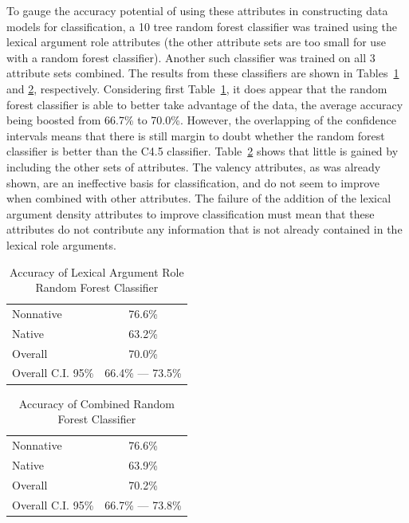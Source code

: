 \documentclass[main.tex]{subfiles}
\begin{document}
To gauge the accuracy potential of using these attributes in constructing data models for classification, a 10 tree random forest classifier was trained using the lexical argument role attributes (the other attribute sets are too small for use with a random forest classifier). Another such classifier was trained on all 3 attribute sets combined. The results from these classifiers are shown in Tables~\ref{table:lex-role-rf-results} and \ref{table:combined-rf-results}, respectively. Considering first Table~\ref{table:lex-role-rf-results}, it does appear that the random forest classifier is able to better take advantage of the data, the average accuracy being boosted from 66.7\% to 70.0\%. However, the overlapping of the confidence intervals means that there is still margin to doubt whether the random forest classifier is better than the C4.5 classifier. Table~\ref{table:combined-rf-results} shows that little is gained by including the other sets of attributes. The valency attributes, as was already shown, are an ineffective basis for classification, and do not seem to improve when combined with other attributes. The failure of the addition of the lexical argument density attributes to improve classification must mean that these attributes do not contribute any information that is not already contained in the lexical role arguments.

\begin{table}[ht]
\centering
\caption{Accuracy of Lexical Argument Role Random Forest Classifier}
\begin{tabular}{l c}
\toprule
Nonnative & 76.6\% \\
Native & 63.2\% \\
Overall & 70.0\% \\
Overall C.I. 95\% & 66.4\% --- 73.5\%\\
\bottomrule
\end{tabular}
\label{table:lex-role-rf-results}
\end{table}

\begin{table}[ht]
\centering
\caption{Accuracy of Combined Random Forest Classifier}
\begin{tabular}{l c}
\toprule
Nonnative & 76.6\% \\
Native & 63.9\% \\
Overall & 70.2\% \\
Overall C.I. 95\% & 66.7\% --- 73.8\%\\
\bottomrule
\end{tabular}
\label{table:combined-rf-results}
\end{table}


\newpage
\biblio
\end{document}
